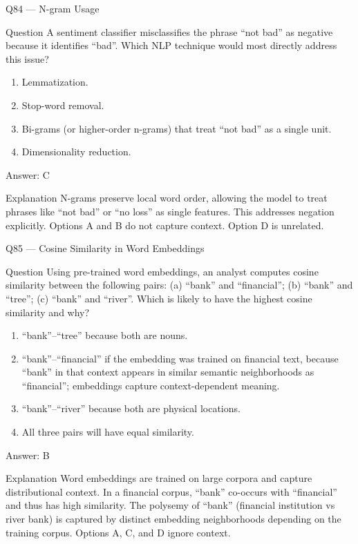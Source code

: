 \documentclass[aspectratio=169,8pt]{beamer}
\begin{document}
\begin{frame}{Q84 --- N-gram Usage}
\begin{block}{Question}
A sentiment classifier misclassifies the phrase ``not bad'' as negative because it identifies ``bad''. Which NLP technique would most directly address this issue?
\end{block}
\begin{enumerate}
\item Lemmatization.
\item Stop-word removal.
\item Bi-grams (or higher-order n-grams) that treat ``not bad'' as a single unit.
\item Dimensionality reduction.
\end{enumerate}
\begin{exampleblock}{Answer: C}\end{exampleblock}
\begin{block}{Explanation}
N-grams preserve local word order, allowing the model to treat phrases like ``not bad'' or ``no loss'' as single features. This addresses negation explicitly. Options A and B do not capture context. Option D is unrelated.
\end{block}
\end{frame}

\begin{frame}{Q85 --- Cosine Similarity in Word Embeddings}
\begin{block}{Question}
Using pre-trained word embeddings, an analyst computes cosine similarity between the following pairs: (a) ``bank'' and ``financial''; (b) ``bank'' and ``tree''; (c) ``bank'' and ``river''. Which is likely to have the highest cosine similarity and why?
\end{block}
\begin{enumerate}
\item ``bank''--``tree'' because both are nouns.
\item ``bank''--``financial'' if the embedding was trained on financial text, because ``bank'' in that context appears in similar semantic neighborhoods as ``financial''; embeddings capture context-dependent meaning.
\item ``bank''--``river'' because both are physical locations.
\item All three pairs will have equal similarity.
\end{enumerate}
\begin{exampleblock}{Answer: B}\end{exampleblock}
\begin{block}{Explanation}
Word embeddings are trained on large corpora and capture distributional context. In a financial corpus, ``bank'' co-occurs with ``financial'' and thus has high similarity. The polysemy of ``bank'' (financial institution vs river bank) is captured by distinct embedding neighborhoods depending on the training corpus. Options A, C, and D ignore context.
\end{block}
\end{frame}
\end{document}

